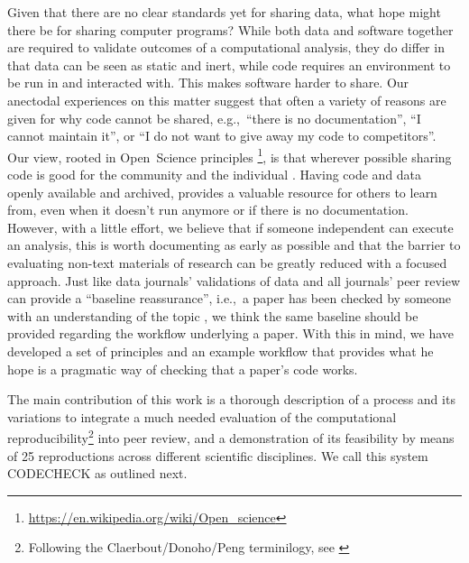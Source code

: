 \documentclass[12pt]{article}
\begin{document}
Given that there are no clear standards yet for sharing data, what hope
might there be for sharing computer programs? While both data and software
together are required to validate outcomes of a computational analysis,
they do differ in  that data can be seen as static and inert,
while code requires an environment to be run in and interacted with.
This makes software harder to share.
Our anectodal experiences
on this matter suggest that often a variety of reasons are given for why
code cannot be shared, e.g.,~``there is no documentation'', ``I cannot 
maintain it'', or ``I do not want to give away my code to competitors''.
Our view, rooted in Open~Science principles
\footnote{\url{https://en.wikipedia.org/wiki/Open_science}}, is that
wherever possible sharing code is good for the community and the 
individual \cite{Barnes2010-iv,markowetz_five_2015}.
Having code and data openly available and archived, 
provides a valuable resource for others to learn
from, even when it doesn't run anymore or if there is no documentation.
However,
with a little effort, we believe that if someone independent can execute
an analysis, this is worth documenting as early as possible and that the barrier
to evaluating non-text materials of research can be greatly reduced with a 
focused approach.
Just like data journals' validations of data and all journals' peer review
can provide a ``baseline reassurance'', i.e.,~a paper
has been checked by someone with an understanding of the topic
\cite{fyfe_mission_2019}, we think the same baseline should be provided
regarding the workflow underlying a paper.
With this in mind, we have developed a set of principles and an example 
workflow that provides what he hope is a pragmatic way of checking that a
paper's code works.

The main contribution of this work is a thorough description of a process
and its variations to integrate a much needed evaluation of the 
computational reproducibility\footnote{Following the 
Claerbout/Donoho/Peng terminilogy, see 
\cite{barba_terminologies_2018}} into peer
review, and a demonstration of its feasibility by means of 25
reproductions across different scientific disciplines.
We call this system CODECHECK as outlined next.
\end{document}
